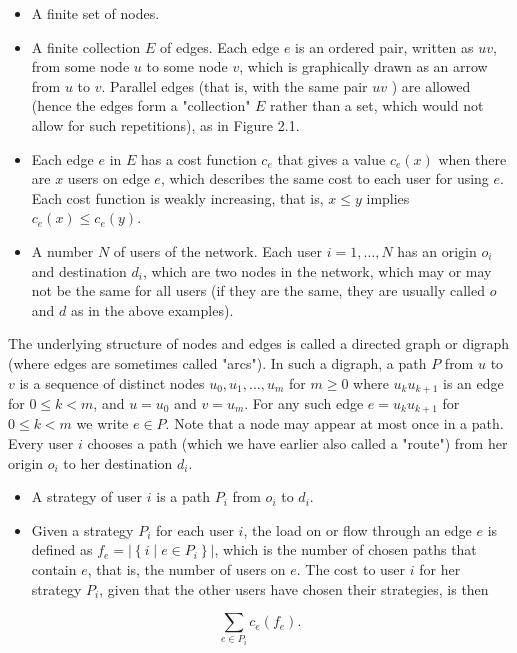 \documentclass[12pt]{article}
\begin{document}
\begin{itemize}
  \item A finite set of nodes.
  \item A finite collection $E$ of edges. Each edge $e$ is an ordered pair, written as $u v$, from some node $u$ to some node $v$, which is graphically drawn as an arrow from $u$ to $v$. Parallel edges (that is, with the same pair $u v$ ) are allowed (hence the edges form a "collection" $E$ rather than a set, which would not allow for such repetitions), as in Figure 2.1.
  \item Each edge $e$ in $E$ has a cost function $c_{e}$ that gives a value $c_{e}(x)$ when there are $x$ users on edge $e$, which describes the same cost to each user for using $e$. Each cost function is weakly increasing, that is, $x \leq y$ implies $c_{e}(x) \leq c_{e}(y)$.
  \item A number $N$ of users of the network. Each user $i=1, \ldots, N$ has an origin $o_{i}$ and destination $d_{i}$, which are two nodes in the network, which may or may not be the same for all users (if they are the same, they are usually called $o$ and $d$ as in the above examples).
\end{itemize}

The underlying structure of nodes and edges is called a directed graph or digraph (where edges are sometimes called "arcs"). In such a digraph, a path $P$ from $u$ to $v$ is a sequence of distinct nodes $u_{0}, u_{1}, \ldots, u_{m}$ for $m \geq 0$ where $u_{k} u_{k+1}$ is an edge for $0 \leq k<m$, and $u=u_{0}$ and $v=u_{m}$. For any such edge $e=u_{k} u_{k+1}$ for $0 \leq k<m$ we write $e \in P$. Note that a node may appear at most once in a path. Every user $i$ chooses a path (which we have earlier also called a "route") from her origin $o_{i}$ to her destination $d_{i}$.

\begin{itemize}
  \item A strategy of user $i$ is a path $P_{i}$ from $o_{i}$ to $d_{i}$.
  \item Given a strategy $P_{i}$ for each user $i$, the load on or flow through an edge $e$ is defined as $f_{e}=\left|\left\{i \mid e \in P_{i}\right\}\right|$, which is the number of chosen paths that contain $e$, that is, the number of users on $e$. The cost to user $i$ for her strategy $P_{i}$, given that the other users have chosen their strategies, is then
\end{itemize}


\begin{equation*}
\sum_{e \in P_{i}} c_{e}\left(f_{e}\right) . \tag{2.1}
\end{equation*}
\end{document}
